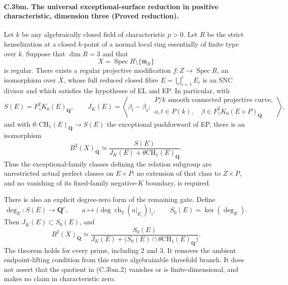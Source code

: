 \paragraph{C.3bm. The universal exceptional-surface reduction in positive
characteristic, dimension three (Proved reduction).}
Let $k$ be any algebraically closed field of characteristic $p>0$.
Let $R$ be the strict henselization at a closed $k$-point of a normal
local ring essentially of finite type over $k$. Suppose that
$\dim R=3$ and that
\[
             X=\operatorname{Spec}R\setminus\{\mathfrak m_R\}
\]
is regular. There exists a regular projective modification
$f:Z\to\operatorname{Spec}R$, an isomorphism over $X$, whose full
reduced closed fibre $E=\bigcup_{i=1}^c E_i$ is an SNC divisor and
which satisfies the hypotheses of EL and EP. In particular, with
\[
 S(E)=F_\gamma^2K_0(E)_{\mathbf Q},\qquad
 J_K(E)=\left\langle\beta_t-\beta_o:
 \begin{array}{l}
 P/k\text{ smooth connected projective curve},\\
 o,t\in P(k),\quad\beta\in F_\gamma^2K_0(E\times P)_{\mathbf Q}
 \end{array}\right\rangle,
\]
and with $\theta:\mathrm{CH}_1(E)_{\mathbf Q}\to S(E)$ the
exceptional pushforward of EP, there is an isomorphism
\begin{equation}
 B^2(X)_{\mathbf Q}\simeq
 \frac{S(E)}{J_K(E)+\theta\mathrm{CH}_1(E)_{\mathbf Q}}.
                                                    \tag{C.3bm.1}
\end{equation}
Thus the exceptional-family classes defining the relation subgroup
are unrestricted actual perfect classes on $E\times P$: no
extension of that class to $Z\times P$, and no vanishing of its
fixed-family negative-$K$ boundary, is required.

There is also an explicit degree-zero form of the remaining gate.
Define
\[
 \deg_E:S(E)\longrightarrow\mathbf Q^c,
 \qquad a\longmapsto
       \bigl(\deg\operatorname{ch}_2(a|_{E_i})\bigr)_i,
 \qquad S_0(E)=\ker(\deg_E).
\]
Then $J_K(E)\subset S_0(E)$, and
\begin{equation}
 B^2(X)_{\mathbf Q}\simeq
 \frac{S_0(E)}{J_K(E)+
        \bigl(S_0(E)\cap\theta\mathrm{CH}_1(E)_{\mathbf Q}\bigr)}.
                                                    \tag{C.3bm.2}
\end{equation}
The theorem holds for every prime, including $2$ and $3$.
It removes the ambient endpoint-lifting condition from this entire
algebraizable threefold branch. It does not assert that the quotient
in (C.3bm.2) vanishes or is finite-dimensional, and makes no claim
in characteristic zero.

